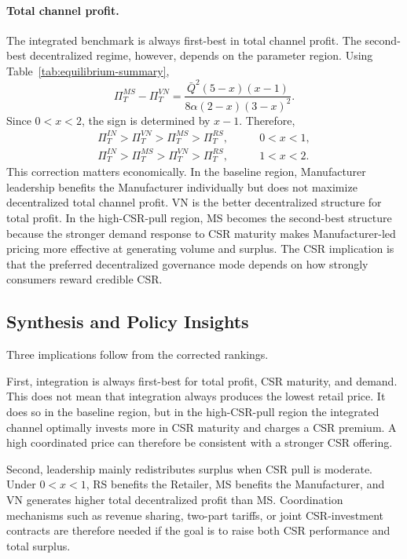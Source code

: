 \paragraph{Total channel profit.}
The integrated benchmark is always first-best in total channel profit. The second-best decentralized regime, however, depends on the parameter region. Using Table~\ref{tab:equilibrium-summary},
\begin{equation*}
    \Pi_T^{MS}-\Pi_T^{VN}
    =\frac{\bar Q^2(5-x)(x-1)}{8\alpha(2-x)(3-x)^2}.
\end{equation*}
Since $0<x<2$, the sign is determined by $x-1$. Therefore,
\begin{align*}
    \Pi_T^{IN}>\Pi_T^{VN}>\Pi_T^{MS}>\Pi_T^{RS},
    \qquad &0<x<1,\\
    \Pi_T^{IN}>\Pi_T^{MS}>\Pi_T^{VN}>\Pi_T^{RS},
    \qquad &1<x<2.
\end{align*}
This correction matters economically. In the baseline region, Manufacturer leadership benefits the Manufacturer individually but does not maximize decentralized total channel profit. VN is the better decentralized structure for total profit. In the high-CSR-pull region, MS becomes the second-best structure because the stronger demand response to CSR maturity makes Manufacturer-led pricing more effective at generating volume and surplus. The CSR implication is that the preferred decentralized governance mode depends on how strongly consumers reward credible CSR.

\subsection{Synthesis and Policy Insights}

Three implications follow from the corrected rankings.

First, integration is always first-best for total profit, CSR maturity, and demand. This does not mean that integration always produces the lowest retail price. It does so in the baseline region, but in the high-CSR-pull region the integrated channel optimally invests more in CSR maturity and charges a CSR premium. A high coordinated price can therefore be consistent with a stronger CSR offering.

Second, leadership mainly redistributes surplus when CSR pull is moderate. Under $0<x<1$, RS benefits the Retailer, MS benefits the Manufacturer, and VN generates higher total decentralized profit than MS. Coordination mechanisms such as revenue sharing, two-part tariffs, or joint CSR-investment contracts are therefore needed if the goal is to raise both CSR performance and total surplus.


